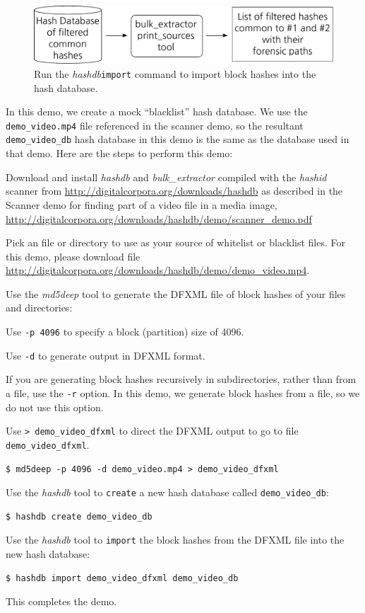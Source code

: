 \documentclass[12pt,twoside]{article}
\newcommand{\hdb}{\emph{hashdb}\xspace}
\newcommand{\bulk}{\emph{bulk\_extractor}\xspace}
\newcommand{\hashid}{\emph{hashid}\xspace}
\newcommand{\mdd}{\emph{md5deep}\xspace}
\begin{document}
\begin{figure}[H]
  \center
  \includegraphics[scale=0.6]{drawings/import}
  \caption*{Run the \hdb \texttt{import} command
            to import block hashes into the hash database.}
\end{figure}

In this demo, we create a mock ``blacklist'' hash database.
We use the \texttt{demo\_video.mp4} file referenced in the scanner demo,
so the resultant \texttt{demo\_video\_db} hash database in this demo
is the same as the database used in that demo.
Here are the steps to perform this demo:
\begin{compactenum}
\item Download and install \hdb  and \bulk compiled with the \hashid scanner
from
\url{http://digitalcorpora.org/downloads/hashdb}
as described in the Scanner demo
for finding part of a video file in a media image,
\url{http://digitalcorpora.org/downloads/hashdb/demo/scanner\_demo.pdf}
\item Pick an file or directory to use
as your source of whitelist or blacklist files.
For this demo, please download file
\url{http://digitalcorpora.org/downloads/hashdb/demo/demo\_video.mp4}.

\item Use the \mdd tool to generate the DFXML file of block hashes
of your files and directories:
\begin{compactitem}
\item Use \texttt{-p 4096} to specify a block (partition) size of 4096.
\item Use \texttt{-d} to generate output in DFXML format.
\item If you are generating block hashes recursively in subdirectories,
rather than from a file, use the \texttt{-r} option.
In this demo, we generate block hashes from a file,
so we do not use this option.
\item Use \texttt{> demo\_video\_dfxml} to direct the DFXML output
to go to file \texttt{demo\_video\_dfxml}.
\end{compactitem}
\begin{verbatim}
$ md5deep -p 4096 -d demo_video.mp4 > demo_video_dfxml
\end{verbatim}

\item Use the \hdb tool to \texttt{create} a new hash database
called \texttt{demo\_video\_db}:
\begin{verbatim}
$ hashdb create demo_video_db
\end{verbatim}

\item Use the \hdb tool to \texttt{import} the block hashes
from the DFXML file into the new hash database:
\begin{verbatim}
$ hashdb import demo_video_dfxml demo_video_db
\end{verbatim}
\end{compactenum}

This completes the demo.
\end{document}
